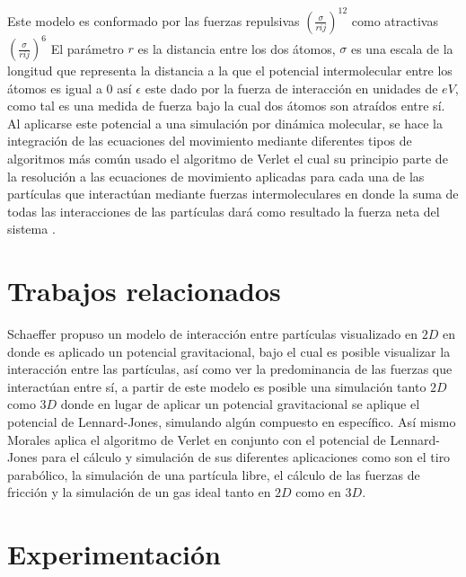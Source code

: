 \documentclass[3pt,twocolumn]{elsarticle}
\begin{document}
Este modelo es conformado por las fuerzas repulsivas $(\frac{\sigma}{rij} )^{12}$ como atractivas $(\frac{\sigma}{rij} )^6$ 
El parámetro $r$ es la distancia entre los dos átomos, $\sigma$ es una escala de la longitud que representa la distancia a la que el potencial intermolecular entre los átomos es igual a $0$ así $\epsilon$ este dado por la fuerza de interacción en unidades de $eV$, como tal es una medida de fuerza bajo la cual dos átomos son atraídos entre sí. Al aplicarse este potencial a una simulación por dinámica molecular, se hace la integración de las ecuaciones del movimiento mediante diferentes tipos de algoritmos más común usado el algoritmo de Verlet el cual su principio parte de la resolución a las ecuaciones de movimiento aplicadas para cada una de las partículas que interactúan mediante fuerzas intermoleculares en donde la suma de todas las interacciones de las partículas dará como resultado la fuerza neta del sistema \cite{docM,LJN}.


\section{Trabajos relacionados}\label{intr}

Schaeffer \cite{elisa} propuso un modelo de interacción entre partículas visualizado en $2D$ en donde es aplicado un potencial gravitacional, bajo el cual es posible visualizar la interacción entre las partículas, así como ver la predominancia de las fuerzas que interactúan entre sí, a partir de este modelo es posible una simulación tanto $2D$ como $3D$ donde en lugar de aplicar un potencial gravitacional se aplique el potencial de Lennard-Jones, simulando algún compuesto en específico.
Así mismo Morales \cite{docM} aplica el algoritmo de Verlet en conjunto con el potencial de Lennard-Jones para el cálculo y simulación de sus diferentes aplicaciones como son el tiro parabólico, la simulación de una partícula libre, el cálculo de las fuerzas de fricción y la simulación de un gas ideal tanto en $2D$ como en $3D$.

\section{Experimentación }\label{intr}
\end{document}
